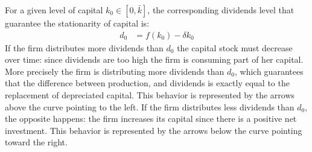 \documentclass[12pt]{report}
\begin{document}
For a given level of capital \(k_0 \in [0,\bar{k}]\), the corresponding dividends level that
guarantee the stationarity of capital is:
\begin{align*}
    d_0 &= f(k_0) -\delta k_0
\end{align*}
If the firm distributes more dividends than \(d_0\) the capital stock must decrease over time: since
dividends are too high the firm is consuming part of her capital. More precisely the firm is distributing more dividends than
\(d_0\), which guarantees that the difference between production, and dividends is exactly equal to the replacement of
depreciated capital.
This behavior is represented by the arrows above the curve pointing to the left. If the firm distributes less
dividends than \(d_0\), the opposite happens: the firm increases its capital since there is a positive net
investment. This behavior is represented by
the arrows below the curve pointing toward the right. 
\end{document}
